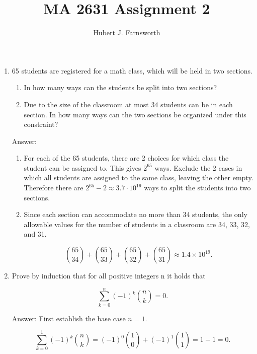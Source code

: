 \documentclass{article}
\title{MA 2631 Assignment 2}
\author{Hubert J. Farnsworth}
\begin{document}
\maketitle

\begin{enumerate}


\item

65 students are registered for a math class, which will be held in two sections.

\begin{enumerate}
\item In how many ways can the students be split into two sections?

\item Due to the size of the classroom at most 34 students can be in each section. In how
many ways can the two sections be organized under this constraint?
\end{enumerate}

Answer:

\begin{enumerate}
\item For each of the 65 students, there are 2 choices for which class the student can be assigned to. This gives $2^{65}$ ways. Exclude the 2 cases in which all students are assigned to the same class, leaving the other empty. Therefore there are $2^{65} - 2 \approx 3.7 \cdot 10^{19}$ ways to split the students into two sections. 

\item Since each section can accommodate no more than 34 students, the only allowable values for the number of students in a classroom are 34, 33, 32, and 31. 

$$
\binom{65}{34} + \binom{65}{33} + \binom{65}{32} + \binom{65}{31} \approx 1.4 \times 10^{19}.
$$ 

\end{enumerate} 

 
\newpage

\item Prove by induction that for all positive integers n it holds that

$$ \sum_{k=0}^n (-1)^k \binom{n}{k} = 0.$$

Answer: First establish the base case $n=1$.

$$
\sum_{k=0}^1 (-1)^k \binom{n}{k} = (-1)^0 \binom{1}{0} + (-1)^1 \binom{1}{1} = 1 - 1 = 0.
$$


\end{enumerate}
\end{document}
